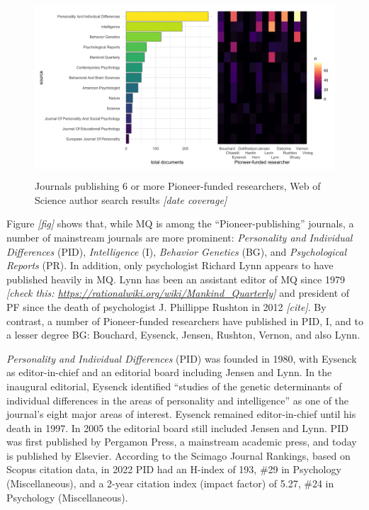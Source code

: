 \documentclass[12pt]{article}
\begin{document}
\begin{figure}
\centering
\includegraphics[width=4.76in,height=2.6in]{img/wos_results.png}
\caption{Journals publishing 6 or more Pioneer-funded researchers, Web
of Science author search results \emph{{[}date coverage{]}}}
\end{figure}

Figure \emph{{[}fig{]}} shows that, while MQ is among the
``Pioneer-publishing'' journals, a number of mainstream journals are
more prominent: \emph{Personality and Individual Differences} (PID),
\emph{Intelligence} (I), \emph{Behavior Genetics} (BG), and
\emph{Psychological Reports} (PR). In addition, only psychologist
Richard Lynn appears to have published heavily in MQ. Lynn has been an
assistant editor of MQ since 1979 \emph{{[}check this:
\url{https://rationalwiki.org/wiki/Mankind_Quarterly}{]}} and president
of PF since the death of psychologist J. Phillippe Rushton in 2012
\emph{{[}cite{]}}. By contrast, a number of Pioneer-funded researchers
have published in PID, I, and to a lesser degree BG: Bouchard, Eysenck,
Jensen, Rushton, Vernon, and also Lynn.

\emph{Personality and Individual Differences} (PID) was founded in 1980,
with Eysenck as editor-in-chief and an editorial board including Jensen
and Lynn. In the inaugural editorial, Eysenck identified ``studies of
the genetic determinants of individual differences in the areas of
personality and intelligence'' as one of the journal's eight major areas
of interest. Eysenck remained editor-in-chief until his death in 1997.
In 2005 the editorial board still included Jensen and Lynn. PID was
first published by Pergamon Press, a mainstream academic press, and
today is published by Elsevier. According to the Scimago Journal
Rankings, based on Scopus citation data, in 2022 PID had an H-index of
193, \#29 in Psychology (Miscellaneous), and a 2-year citation index
(impact factor) of 5.27, \#24 in Psychology (Miscellaneous).
\end{document}
